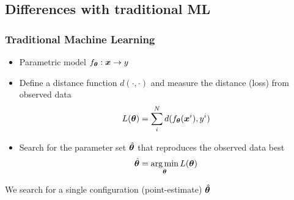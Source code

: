 \subsection{Differences with traditional ML}
\begin{frame}
  \frametitle{Traditional Machine Learning}
  \begin{itemize}
    \item Parametric model \( f_{\boldsymbol{\theta}}: \boldsymbol{x} \rightarrow y \)
    \item Define a distance function \( d(\cdot, \cdot) \) and measure the
          distance (loss) from observed data
      \begin{equation}
        L(\boldsymbol{\theta}) = \sum_i^N d(f_{\boldsymbol{\theta}}(\boldsymbol{x}^i), y^i)
      \end{equation}
    \item Search for the parameter set $\hat{\boldsymbol{\theta}}$ that reproduces the observed data best
      \begin{equation}
         \hat{\boldsymbol{\theta}} = \operatorname*{arg\,min}_{\boldsymbol{\theta}} L(\boldsymbol{\theta})
      \end{equation}
    \end{itemize}
    \noindent\makebox[\linewidth]{\rule{\paperwidth}{0.4pt}}
    We search for a \alert{single configuration (point-estimate) \( \hat{\boldsymbol{\theta}}\) }

\end{frame}


